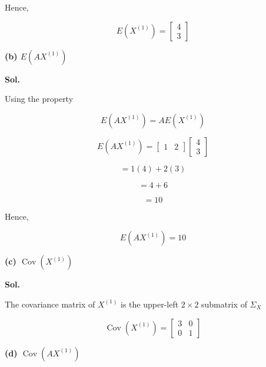 \documentclass[12pt]{article}
\begin{document}
\noindent
Hence,

\[
\boxed{
E(X^{(1)})
=
\begin{bmatrix}
4\\
3
\end{bmatrix}
}
\]

\vspace{1cm}

\noindent
\textbf{(b) \(E(AX^{(1)})\)}

\vspace{0.5cm}

\noindent
\textbf{Sol.}

\vspace{0.3cm}

\noindent
Using the property

\[
E(AX^{(1)})
=
AE(X^{(1)})
\]

\[
E(AX^{(1)})
=
\begin{bmatrix}
1 & 2
\end{bmatrix}
\begin{bmatrix}
4\\
3
\end{bmatrix}
\]

\[
=
1(4)+2(3)
\]

\[
=
4+6
\]

\[
=
10
\]

\noindent
Hence,

\[
\boxed{
E(AX^{(1)})=10
}
\]

\vspace{1cm}

\noindent
\textbf{(c) \(\operatorname{Cov}(X^{(1)})\)}

\vspace{0.5cm}

\noindent
\textbf{Sol.}

\vspace{0.3cm}

\noindent
The covariance matrix of \(X^{(1)}\) is the upper-left \(2\times2\) submatrix of \(\Sigma_X\)

\[
\boxed{
\operatorname{Cov}(X^{(1)})
=
\begin{bmatrix}
3 & 0\\
0 & 1
\end{bmatrix}
}
\]

\vspace{1cm}

\noindent
\textbf{(d) \(\operatorname{Cov}(AX^{(1)})\)}

\vspace{0.5cm}
\end{document}
